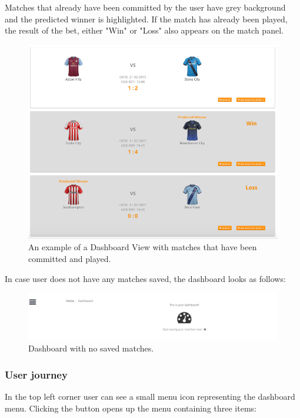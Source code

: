 Matches that already have been committed by the user have grey background and the predicted winner is highlighted. If the match has already been played, the result of the bet, either "Win" or "Loss" also appears on the match panel.

\begin{figure}[H]
	\begin{center}
		\includegraphics[width=.90\textwidth]{impl/images/dashboardCommittedMatches}
		\caption{An example of a Dashboard View with matches that have been committed and played.} \label{fig:dashboardcommittedmatches}
	\end{center}
\end{figure}

In case user does not have any matches saved, the dashboard looks as follows:

\begin{figure}[H]
	\begin{center}
		\includegraphics[width=.90\textwidth]{impl/images/noSavedMatches}
		\caption{Dashboard with no saved matches.} \label{fig:using: nosavedmatches}
	\end{center}
\end{figure}

\subsubsection*{User journey}
\label{subsec:dashboarduserjourney}
In the top left corner user can see a small menu icon representing the dashboard menu. Clicking the button opens up the menu containing three items:

